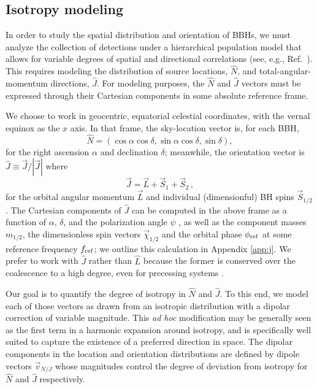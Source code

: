 \documentclass[aps,prd,twocolumn,superscriptaddress,preprintnumbers,floatfix,nofootinbib]{revtex4-2}
\begin{document}
\subsection{Isotropy modeling}

\newcommand*{\dip}[1]{\vec{v}_{#1}}
\newcommand*{\dipraw}[1]{\vec{u}_{#1}}

In order to study the spatial distribution and orientation of \acp{BBH}, we must analyze the collection of detections under a hierarchical population model that allows for variable degrees of spatial and directional correlations (see, e.g., Ref.~\cite{Essick:2022slj}).
This requires modeling the distribution of source locations, $\hat{N}$, and total-angular-momentum directions, $\hat{J}$.
For modeling purposes, the $\hat{N}$ and $\hat{J}$ vectors must be expressed through their Cartesian components in some absolute reference frame.

We choose to work in geocentric, equatorial celestial coordinates, with the vernal equinox as the $x$ axis.
In that frame, the sky-location vector is, for each \ac{BBH},
\begin{equation} \label{eq:n}
\hat{N} = \left( \cos\alpha \cos\delta, \sin\alpha \cos\delta, \sin\delta \right) ,
\end{equation}
for the right ascension $\alpha$ and declination $\delta$; meanwhile, the orientation vector is $\hat{J} \equiv \vec{J} / |\vec{J}|$ where
\begin{equation} \label{eq:j}
\vec{J} = \vec{L} + \vec{S}_1 + \vec{S}_2 \, ,
\end{equation}
for the orbital angular momentum $\vec{L}$ and individual (dimensionful) \ac{BH} spins $\vec{S}_{1/2}$.
The Cartesian components of $\hat{J}$ can be computed in the above frame as a function of $\alpha$, $\delta$, and the polarization angle $\psi$ \cite{Isi:2022mbx}, as well as the component masses $m_{1/2}$, the dimensionless spin vectors $\vec{\chi}_{1/2}$ and the orbital phase $\phi_{\rm ref}$ at some reference frequency $f_{\rm ref}$; we outline this calculation in Appendix \ref{app:j}.
We prefer to work with $\hat{J}$ rather than $\hat{L}$ because the former is conserved over the coalescence to a high degree, even for precessing systems \cite{poisson2014gravity}.

Our goal is to quantify the degree of isotropy in $\hat{N}$ and $\hat{J}$.
To this end, we model each of those vectors as drawn from an isotropic distribution with a dipolar correction of variable magnitude.
This \emph{ad hoc} modification may be generally seen as the first term in a harmonic expansion around isotropy, and is specifically well suited to capture the existence of a preferred direction in space.
The dipolar components in the location and orientation distributions are defined by dipole vectors $\dip{N/J}$ whose magnitudes control the degree of deviation from isotropy for $\hat{N}$ and $\hat{J}$ respectively. 
\end{document}
